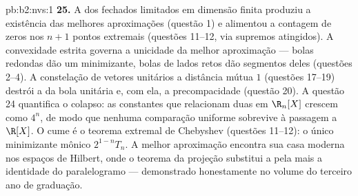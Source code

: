 \begin{solution}{pb:b2:nvs:1}
\textbf{25.} A  dos fechados limitados em dimensão
finita produziu a existência das melhores aproximações (questão
1) e alimentou a contagem de zeros nos $n + 1$ pontos extremais
(questões 11--12, via supremos atingidos). A convexidade estrita governa
a unicidade da melhor aproximação --- bolas redondas dão um
minimizante, bolas de lados retos dão segmentos deles (questões
2--4). A constelação de vetores unitários a distância mútua
$1$ (questões 17--19) destrói a  da bola unitária
e, com ela, a precompacidade (questão 20). A questão 24
quantifica o colapso: as constantes que relacionam duas  em
$\R_n[X]$ crescem como $4^n$, de modo que nenhuma comparação uniforme sobrevive
à passagem a $\R[X]$. O cume é o teorema extremal de
Chebyshev (questões 11--12): o único minimizante mônico
$2^{1-n}T_n$. A melhor aproximação encontra sua casa moderna nos
espaços de Hilbert, onde o teorema da projeção substitui a
 pela  mais a identidade do paralelogramo ---
demonstrado honestamente no volume do terceiro ano de graduação.
\end{solution}

